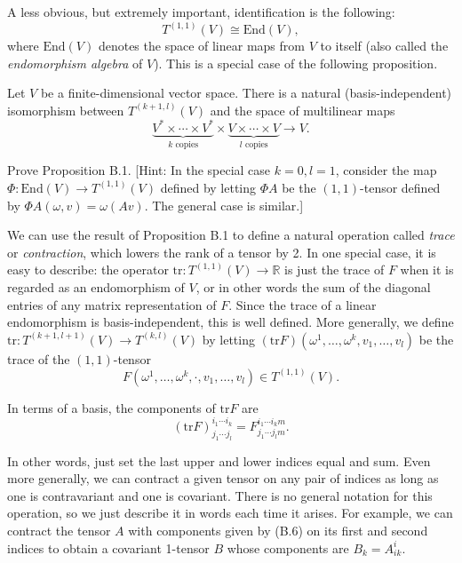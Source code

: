 A less obvious, but extremely important, identification is the following:
\[
T^{(1,1)}(V) \cong \text{End}(V),
\]
where $\text{End}(V)$ denotes the space of linear maps from $V$ to itself (also called the \emph{endomorphism algebra} of $V$). This is a special case of the following proposition.

\begin{proposition}
\label{prop:multilinear-maps-tensor-isomorphism}
Let $V$ be a finite-dimensional vector space. There is a natural (basis-independent) isomorphism between $T^{(k+1,l)}(V)$ and the space of multilinear maps
\[
\underbrace{V^* \times \cdots \times V^*}_{k \text{ copies}} \times \underbrace{V \times \cdots \times V}_{l \text{ copies}} \to V.
\]
\end{proposition}

\begin{exercise}
\label{exer:prove-multilinear-maps-isomorphism}
Prove Proposition B.1. [Hint: In the special case $k = 0, l = 1$, consider the map $\Phi : \text{End}(V) \to T^{(1,1)}(V)$ defined by letting $\Phi A$ be the $(1, 1)$-tensor defined by $\Phi A(\omega, v) = \omega(Av)$. The general case is similar.]
\end{exercise}

\noindent We can use the result of Proposition B.1 to define a natural operation called \textit{trace} or \textit{contraction}, which lowers the rank of a tensor by 2. In one special case, it is easy to describe: the operator $\mathrm{tr}: T^{(1,1)}(V) \to \mathbb{R}$ is just the trace of $F$ when it is regarded as an endomorphism of $V$, or in other words the sum of the diagonal entries of any matrix representation of $F$. Since the trace of a linear endomorphism is basis-independent, this is well defined. More generally, we define $\mathrm{tr}: T^{(k+1,l+1)}(V) \to T^{(k,l)}(V)$ by letting $(\mathrm{tr} F)(\omega^1,\ldots,\omega^k, v_1,\ldots,v_l)$ be the trace of the $(1,1)$-tensor
\[
F(\omega^1,\ldots,\omega^k,\cdot, v_1,\ldots,v_l) \in T^{(1,1)}(V).
\]

In terms of a basis, the components of $\mathrm{tr} F$ are
\[
(\mathrm{tr} F)_{j_1 \cdots j_l}^{i_1 \cdots i_k} = F_{j_1 \cdots j_l m}^{i_1 \cdots i_k m}.
\]

In other words, just set the last upper and lower indices equal and sum. Even more generally, we can contract a given tensor on any pair of indices as long as one is contravariant and one is covariant. There is no general notation for this operation, so we just describe it in words each time it arises. For example, we can contract the tensor $A$ with components given by (B.6) on its first and second indices to obtain a covariant 1-tensor $B$ whose components are $B_k = A^i_{i k}$.

